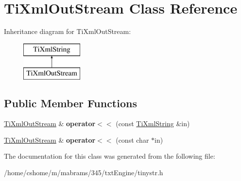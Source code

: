 \hypertarget{class_ti_xml_out_stream}{
\section{\-Ti\-Xml\-Out\-Stream \-Class \-Reference}
\label{class_ti_xml_out_stream}
}
\-Inheritance diagram for \-Ti\-Xml\-Out\-Stream\-:\begin{figure}[H]
\begin{center}
\leavevmode
\includegraphics[height=2.000000cm]{class_ti_xml_out_stream}
\end{center}
\end{figure}
\subsection*{\-Public \-Member \-Functions}
\begin{DoxyCompactItemize}
\item 
\hypertarget{class_ti_xml_out_stream_a3640dcb1c0903be3bc6966cdc9a79db6}{
\hyperlink{class_ti_xml_out_stream}{\-Ti\-Xml\-Out\-Stream} \& {\bfseries operator$<$$<$} (const \hyperlink{class_ti_xml_string}{\-Ti\-Xml\-String} \&in)}
\label{class_ti_xml_out_stream_a3640dcb1c0903be3bc6966cdc9a79db6}

\item 
\hypertarget{class_ti_xml_out_stream_af2117e5a8cbfcb69544804ad2859bfb6}{
\hyperlink{class_ti_xml_out_stream}{\-Ti\-Xml\-Out\-Stream} \& {\bfseries operator$<$$<$} (const char $\ast$in)}
\label{class_ti_xml_out_stream_af2117e5a8cbfcb69544804ad2859bfb6}

\end{DoxyCompactItemize}


\-The documentation for this class was generated from the following file\-:\begin{DoxyCompactItemize}
\item 
/home/cshome/m/mabrams/345/txt\-Engine/tinystr.\-h\end{DoxyCompactItemize}
